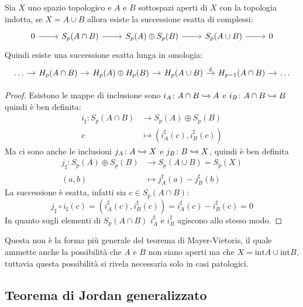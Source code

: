 \begin{theorem}
  Sia $ X $ uno spazio topologico e $ A $ e $ B $ sottospazi aperti di $ X $ con la
  topologia indotta, se $ X = A \cup B $ allora esiste la successione esatta di complessi:
  \[
    \begin{tikzcd}
      0 \rar & S_p(A \cap B) \rar & S_p(A) \oplus S_p(B) \rar & S_p(A \cup B) \rar & 0
    \end{tikzcd}
  \]
  Quindi esiste una successione esatta lunga in omologia:
  \[
    \begin{tikzcd}[nodes = {column sep = 10 pt}]
      \dots \rar & H_p(A \cap B) \rar & H_p(A) \oplus H_p(B) \rar & H_p(A \cup B) \rar{\delta} & H_{p-1}(A \cap B) \rar & \dots
    \end{tikzcd}
  \]
\end{theorem}
\begin{proof}
  Esistono le mappe di inclusione sono $ i_A \colon A \cap B \xhookrightarrow{} A $ e $ i_B \colon A \cap B \xhookrightarrow{} B $ quindi
  è ben definita:
  \begin{align*}
    i_\sharp \colon S_p(A \cap B) & \to S_p(A) \oplus S_p(B) \\
    c & \mapsto (i_A^\sharp (c), i_B^\sharp (c))
  \end{align*}
  Ma ci sono anche le inclusioni $ j_A \colon A \xhookrightarrow{} X $ e $ j_B \colon B \xhookrightarrow{} X $,
  quindi è ben definita
  \begin{align*}
    j_\sharp \colon  S_p(A) \oplus S_p(B) & \to S_p(A \cup B) = S_p(X) \\
    (a,b) &  \mapsto j_A^\sharp(a) - j_B^\sharp(b)
  \end{align*}
  La successione è esatta, infatti sia $ c \in S_p(A \cap B) $:
  \[
    j_\sharp \circ i_\sharp (c) = (i_A^\sharp (c), i_B^\sharp (c)) = i_A^\sharp (c) -  i_B^\sharp (c) = 0
  \]
  In quanto sugli elementi di $ S_p(A \cap B) $ $ i_A^\sharp $ e $ i_B^\sharp $ agiscono
  allo stesso modo.
\end{proof}

\begin{osservation}
  Questa non è la forma più generale del teorema di Mayer-Vietoris, il quale
  ammette anche la possibilità che $ A $ e $ B $ non siano aperti ma che
  $ X = \mathrm{int} A \cup \mathrm{int} B $, tuttavia questa possibilità si rivela
  necessaria solo in casi patologici.
\end{osservation}

\subsection{Teorema di Jordan generalizzato}

